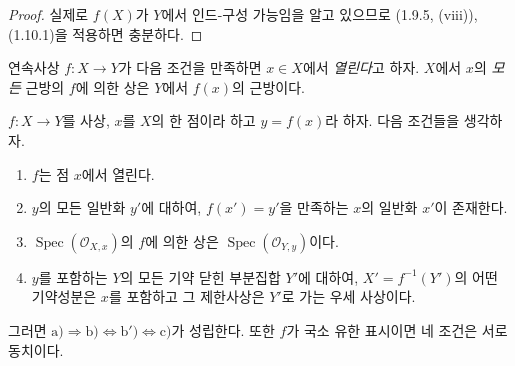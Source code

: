 \begin{proof}
실제로 $f(X)$가 $Y$에서 인드-구성 가능임을 알고 있으므로 (1.9.5,
(viii)), (1.10.1)을 적용하면 충분하다.
\end{proof}

연속사상 $f:X\to Y$가 다음 조건을 만족하면 $x\in X$에서
\emph{열린다}고 하자. $X$에서 $x$의 \emph{모든} 근방의 $f$에 의한
상은 $Y$에서 $f(x)$의 근방이다.

\begin{proposition}[1.10.3]
\label{IV.1.10.3-ko}
$f:X\to Y$를 사상, $x$를 $X$의 한 점이라 하고 $y=f(x)$라 하자.
다음 조건들을 생각하자.
\begin{enumerate}
  \item[a)] $f$는 점 $x$에서 열린다.
  \item[b)] $y$의 모든 일반화 $y'$에 대하여, $f(x')=y'$을 만족하는
  $x$의 일반화 $x'$이 존재한다.
  \item[b')] $\operatorname{Spec}(\mathcal O_{X,x})$의 $f$에 의한 상은
  $\operatorname{Spec}(\mathcal O_{Y,y})$이다.
  \item[c)] $y$를 포함하는 $Y$의 모든 기약 닫힌 부분집합 $Y'$에
  대하여, $X'=f^{-1}(Y')$의 어떤 기약성분은 $x$를 포함하고 그
  제한사상은 $Y'$로 가는 우세 사상이다.
\end{enumerate}
그러면
$\mathrm{a)}\Rightarrow\mathrm{b)}\Leftrightarrow\mathrm{b')}
\Leftrightarrow\mathrm{c)}$가 성립한다. 또한 $f$가 국소 유한 표시이면
네 조건은 서로 동치이다.
\end{proposition}

